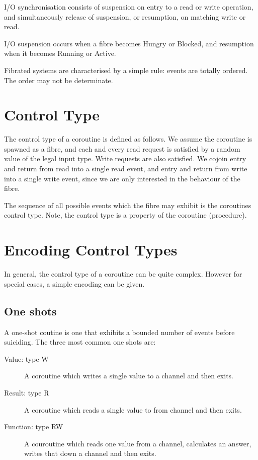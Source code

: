 \documentclass{article}
\begin{document}
I/O synchronisation consists of suspension on entry
to a read or write operation, and simultaneously release
of suspension, or resumption, on matching write or read.

I/O suspension occurs when a fibre becomes Hungry or Blocked,
and resumption when it becomes Running or Active.

Fibrated systems are characterised by a simple rule: events are
totally ordered. The order may not be determinate. 

\section{Control Type}
The control type of a coroutine is defined as follows.
We assume the coroutine is spawned as a fibre, and each
and every read request is satisfied by a random value of
the legal input type. Write requests are also satisfied.
We cojoin entry and return from read into a single read
event, and entry and return from write into a single
write event, since we are only interested in the behaviour
of the fibre.

The sequence of all possible events which the fibre
may exhibit is the coroutines control type. Note, the
control type is a property of the coroutine (procedure).

\section{Encoding Control Types}
In general, the control type of a coroutine can be quite
complex. However for special cases, a simple encoding
can be given.

\subsection{One shots}
A one-shot coutine is one that exhibits a bounded number
of events before suiciding. The three most common one
shots are:

\begin{description}
\item[Value: type W] A coroutine which writes a single value to
a channel and then exits.
\item[Result: type R] A coroutine which reads a single value to
from channel and then exits.
\item[Function: type RW] A couroutine which reads one value
from a channel, calculates an answer, writes that
down a channel and then exits.
\end{description}
\end{document}
